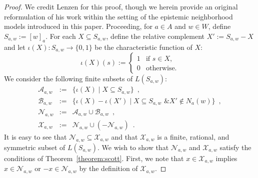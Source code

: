\documentclass[12pt]{article}
\theoremstyle{definition}
\begin{document}
\begin{proof}
  We credit Lenzen \cite{Lenzen1980:gwuw} for this proof, though we
  herein provide an original reformulation of his work within the
  setting of the epistemic neighborhood models introduced in this
  paper.  Proceeding, for $a\in A$ and $w\in W$, define
  $S_{a,w}:=[w]_a$.  For each $X\subseteq S_{a,w}$, define the
  relative complement $X':=S_{a,w}-X$ and let
  $\iota(X):S_{a,w}\to\{0,1\}$ be the characteristic function of $X$:
  \[
  \iota(X)(s):=\begin{cases}
    1 & \text{if } s\in X, \\
    0 & \text{otherwise.}
  \end{cases}
  \]
  We consider the following finite subsets of $L(S_{a,w})$:
  \begin{eqnarray*}
    \mathcal{A}_{a,w} &:=& 
    \{\iota(X)\mid X\subseteq S_{a,w}\}\enspace, 
    \\
    \mathcal{B}_{a,w} &:=& 
    \{\iota(X)-\iota(X')\mid X\subseteq S_{a,w} 
    \text{ \& } X'\notin N_a(w)\}\enspace,
    \\
    \mathcal{N}_{a,w} &:=&
    \mathcal{A}_{a,w}\cup\mathcal{B}_{a,w}\enspace,
    \\
    \mathcal{X}_{a,w} &:=&
    \mathcal{N}_{a,w}\cup(-\mathcal{N}_{a,w})\enspace.
  \end{eqnarray*}
  It is easy to see that $\mathcal{N}_{a,w}\subseteq\mathcal{X}_{a,w}$
  and that $\mathcal{X}_{a,w}$ is a finite, rational, and symmetric
  subset of $L(S_{a,w})$.  We wish to show that $\mathcal{N}_{a,w}$
  and $\mathcal{X}_{a,w}$ satisfy the conditions of
  Theorem~\ref{theorem:scott}. First, we note that
  $x\in\mathcal{X}_{a,w}$ implies $x\in\mathcal{N}_{a,w}$ or
  $-x\in\mathcal{N}_{a,w}$ by the definition of $\mathcal{X}_{a,w}$.


\end{proof}
\end{document}
